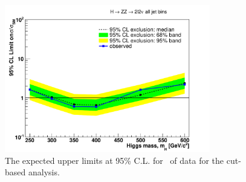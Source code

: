 \begin{figure}[!htbp]
\begin{center}
   \includegraphics[width=0.8\textwidth]{figures/limits_cut_5fb.pdf}
   \caption{ The expected upper limits at 95\% C.L. for \intlumi\ of data for the cut-based analysis.}
   \label{fig:limits_5fb}
\end{center}
\end{figure}


\clearpage

